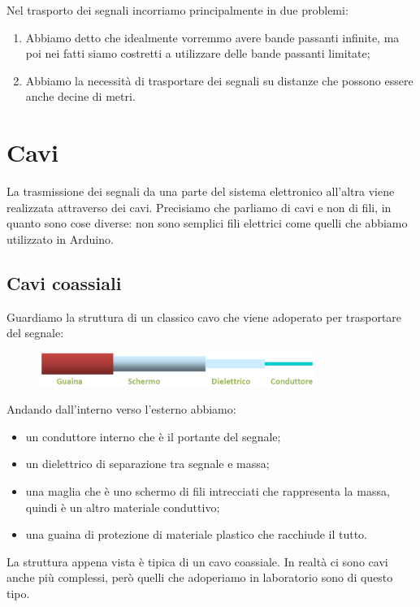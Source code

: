 Nel trasporto dei segnali incorriamo principalmente in due problemi:

\begin{enumerate}[leftmargin=0.6cm]
   \item Abbiamo detto che idealmente vorremmo avere bande passanti infinite, ma poi nei fatti siamo costretti a utilizzare delle bande passanti limitate;
   \item Abbiamo la necessità di trasportare dei segnali su distanze che possono essere anche decine di metri.
\end{enumerate}

\section{Cavi}
La trasmissione dei segnali da una parte del sistema elettronico all'altra viene realizzata attraverso dei cavi. Precisiamo che parliamo di cavi e non di fili, in quanto sono cose diverse: non sono semplici fili elettrici come quelli che abbiamo utilizzato in Arduino.

\subsection{Cavi coassiali}
Guardiamo la struttura di un classico cavo che viene adoperato per trasportare del segnale:
\begin{figure}[H]
   \centering
   \includegraphics[width=0.8\textwidth]{immagini/cavi_coassiali.png}
\end{figure}
Andando dall'interno verso l'esterno abbiamo:
\begin{itemize}
   \item un conduttore interno che è il portante del segnale;
   \item un dielettrico di separazione tra segnale e massa;
   \item una maglia che è uno schermo di fili intrecciati che rappresenta la massa, quindi è un altro materiale conduttivo;
   \item una guaina di protezione di materiale plastico che racchiude il tutto.
\end{itemize}
La struttura appena vista è tipica di un cavo coassiale. In realtà ci sono cavi anche più complessi, però quelli che adoperiamo in laboratorio sono di questo tipo.

